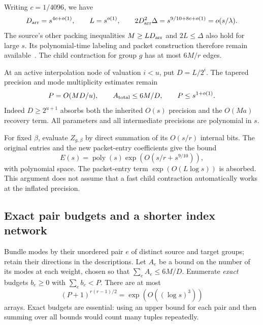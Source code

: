 \documentclass[11pt]{article}
\theoremstyle{definition}
\theoremstyle{remark}
\newcommand{\poly}{\operatorname{poly}}
\begin{document}
Writing $c=1/4096$, we have
\[
 D_{\rm arr}=s^{4c+o(1)},\qquad L=s^{o(1)},\qquad
 2D_{\rm arr}^{2}\Delta=s^{9/10+8c+o(1)}=o(s/\lambda).
\]
The source's other packing inequalities $M\ge LD_{\rm arr}$ and
$2L\le\Delta$ also hold for large $s$. Its polynomial-time labeling and
packet construction therefore remain available~\cite{contraction}. The
child contraction for group $g$ has at most $6M/r$ edges.

At an active interpolation node of valuation $i<u$, put $D=L/2^i$. The
tapered precision and mode multiplicity estimates remain
\begin{equation}\label{eq:one-stage}
 P=O(MD/u),\qquad A_{\rm total}\le6M/D,
 \qquad P\le s^{1+o(1)}.
\end{equation}
Indeed $D\ge2^{u+1}$ absorbs both the inherited $O(s)$ precision and the
$O(Ma)$ recovery term. All parameters and all intermediate precisions are
polynomial in $s$.

For fixed $\beta$, evaluate $Z_{g,\beta}$ by direct summation of its
$O(s/r)$ internal bits. The original entries and the new packet-entry
coefficients give the bound
\begin{equation}\label{eq:group-time}
 E(s)=\poly(s)\exp(O(s/r+s^{9/10})),
\end{equation}
with polynomial space. The packet-entry term
$\exp(O(L\log s))$ is absorbed. This argument does not assume that a
fast child contraction automatically works at the inflated precision.

\subsection{Exact pair budgets and a shorter index network}
Bundle modes by their unordered pair $e$ of distinct source and target groups;
retain their directions in the descriptions. Let $A_e$ be a bound on the
number of its modes at each weight, chosen so that
$\sum_eA_e\le6M/D$. Enumerate \emph{exact} budgets $b_e\ge0$ with
$\sum_eb_e<P$. There are at most
\begin{equation}\label{eq:budget-arrays}
 (P+1)^{r(r-1)/2}=\exp(O((\log s)^3))
\end{equation}
arrays. Exact budgets are essential: using an upper bound for each pair and
then summing over all bounds would count many tuples repeatedly.
\end{document}
